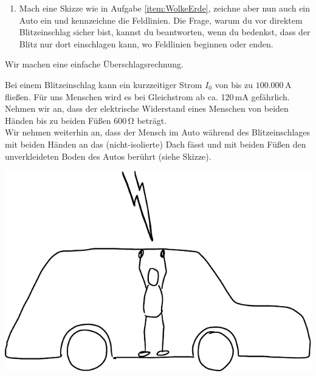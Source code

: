 \documentclass[task=1]{exercise}
\begin{document}
\begin{enumerate}
\begin{enumerate}[label=\textnormal{\arabic*)}]
\begin{minipage}[t]{.5\linewidth}
  \end{minipage}\\
  \vspace{1cm}
  \item
  \begin{minipage}[t]{.5\linewidth}
   Mach eine Skizze wie in Aufgabe \ref{item:WolkeErde}, zeichne aber nun auch ein Auto ein und kennzeichne die Feldlinien. Die Frage, warum du vor direktem Blitzeinschlag sicher bist, kannst du beantworten, wenn du bedenkst, dass der Blitz nur dort einschlagen kann, wo Feldlinien beginnen oder enden.
  \end{minipage}
  \end{enumerate}
  \end{enumerate}
  
  \newpage
  Wir machen eine einfache Überschlagsrechnung.\\
  \begin{minipage}[t]{.65\linewidth}
      Bei einem Blitzeinschlag kann ein kurzzeitiger Strom $I_0$ von bis zu $100.000\,\mathrm{A}$ fließen. Für uns Menschen wird es bei Gleichstrom ab ca. 120\,mA gefährlich.\\
      Nehmen wir an, dass der elektrische Widerstand eines Menschen von beiden Händen bis zu beiden Füßen $600\,\mathrm{\Omega}$ beträgt.\\
      Wir nehmen weiterhin an, dass der Mensch im Auto während des Blitzeinschlages mit beiden Händen an das (nicht-isolierte) Dach fässt und mit beiden Füßen den unverkleideten Boden des Autos berührt (siehe Skizze).
    \end{minipage}
    \hfill
    \begin{minipage}[t]{.3\linewidth}
    \vspace{.1cm}
    \includegraphics[width=\linewidth]{images/MenschImAuto.pdf}
    \end{minipage}\\~\\~\\
\end{document}
